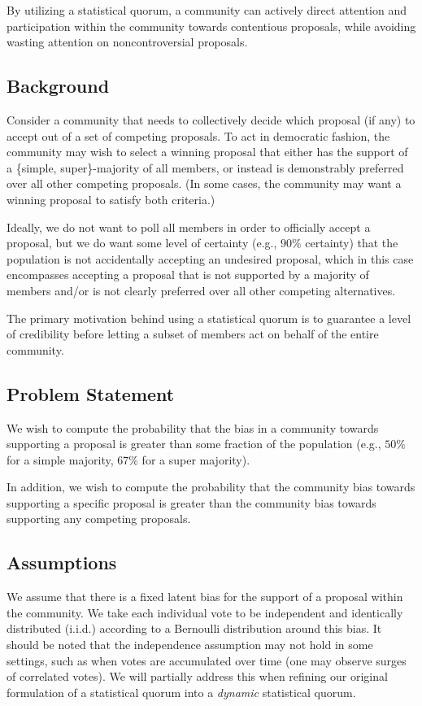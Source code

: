 \documentclass[chi_draft]{sigchi}
\begin{document}
By utilizing a statistical quorum, a community can actively direct attention and participation within the community towards contentious proposals, while avoiding wasting attention on noncontroversial proposals.

\subsection{Background}
Consider a community that needs to collectively decide which proposal (if any) to accept out of a set of competing proposals.
To act in democratic fashion, the community may wish to select a winning proposal that either has the support of a \{simple, super\}-majority of all members, or instead is demonstrably preferred over all other competing proposals.  (In some cases, the community may want a winning proposal to satisfy both criteria.)

Ideally, we do not want to poll all members in order to officially accept a proposal, but we do want some level of certainty (e.g., $90\%$ certainty) that
the population is not accidentally accepting an undesired proposal, which in this case encompasses accepting a proposal that is not supported by a majority of members and/or is not clearly preferred over all other competing alternatives.

The primary motivation behind using a statistical quorum is to guarantee a level of credibility before letting a subset of members act on behalf of the entire community.

\subsection{Problem Statement}
We wish to compute the probability that the bias in a community towards supporting a proposal is greater than some
fraction of the population (e.g., $50\%$ for a simple majority, $67\%$ for a super majority).

In addition, we wish to compute the probability that the community bias towards supporting a specific proposal is greater than the community bias towards supporting any competing proposals.

\subsection{Assumptions}
We assume that there is a fixed latent bias for the support of a proposal within the community.  We take each individual vote to be independent and identically distributed (i.i.d.) according to a Bernoulli distribution around this bias.  It should be noted that the independence assumption may not hold in some settings, such as when votes are accumulated over time (one may observe surges of correlated votes).  We will partially address this when refining our original formulation of a statistical quorum into a \textit{dynamic} statistical quorum.
\end{document}
